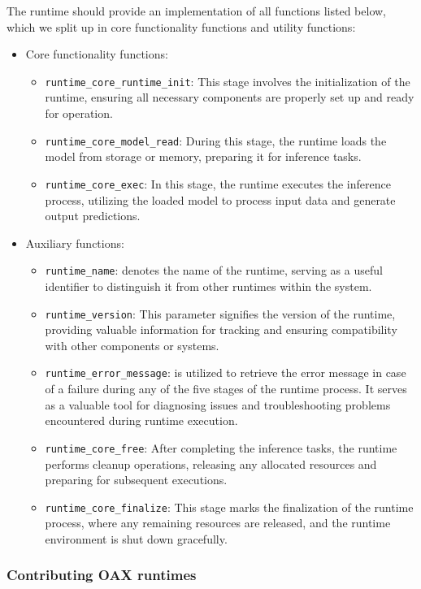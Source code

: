 \documentclass{article}
\begin{document}
The runtime should provide an implementation of all functions listed below, which we split up in core functionality functions and utility functions:
\begin{itemize}
	\item Core functionality functions:
	\begin{itemize}
		\item \texttt{runtime\_core\_runtime\_init}: This stage involves the initialization of the runtime, ensuring all necessary components are properly set up and ready for operation.
		\item \texttt{runtime\_core\_model\_read}: During this stage, the runtime loads the model from storage or memory, preparing it for inference tasks.
		\item \texttt{runtime\_core\_exec}: In this stage, the runtime executes the inference process, utilizing the loaded model to process input data and generate output predictions.
	\end{itemize}
	\item Auxiliary functions:
	\begin{itemize}
		\item \texttt{runtime\_name}: denotes the name of the runtime, serving as a useful identifier to distinguish it from other runtimes within the system.
		\item \texttt{runtime\_version}: This parameter signifies the version of the runtime, providing valuable information for tracking and ensuring compatibility with other components or systems.
		\item \texttt{runtime\_error\_message}: is utilized to retrieve the error message in case of a failure during any of the five stages of the runtime process. It serves as a valuable tool for diagnosing issues and troubleshooting problems encountered during runtime execution.
		\item \texttt{runtime\_core\_free}: After completing the inference tasks, the runtime performs cleanup operations, releasing any allocated resources and preparing for subsequent executions.
		\item \texttt{runtime\_core\_finalize}: This stage marks the finalization of the runtime process, where any remaining resources are released, and the runtime environment is shut down gracefully.
	\end{itemize}
\end{itemize}

\subsubsection{Contributing OAX runtimes}
\end{document}
